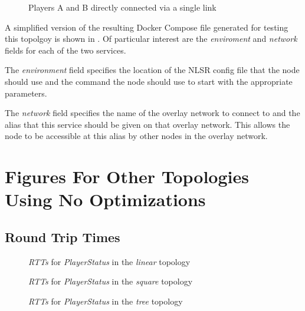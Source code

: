 \begin{appendices}
\begin{figure}[H]
    \centering
    \caption{Players A and B directly connected via a single link}
    \label{fig:app:docker-l2}
\end{figure}

A simplified version of the resulting Docker Compose file generated for testing this topolgoy is shown in . Of particular interest are the \textit{enviroment} and \textit{network} fields for each of the two services. 

The \textit{environment} field specifies the location of the NLSR config file that the node should use and the command the node should use to start \game{} with the appropriate parameters.

The \textit{network} field specifies the name of the overlay network to connect to and the alias that this service should be given on that overlay network. This allows the node to be accessible at this alias by other nodes in the overlay network.







\chapter{Figures For Other Topologies Using No Optimizations}\label{app:eval:basic}
\section{Round Trip Times}
\begin{figure}[H]
    \centering
    \caption{\textit{RTTs} for \textit{PlayerStatus} in the \textit{linear} topology}
    \label{fig:app:rtt:linear}
\end{figure}

\begin{figure}[H]
    \centering
    \caption{\textit{RTTs} for \textit{PlayerStatus} in the \textit{square} topology}
    \label{fig:app:rtt:square}
\end{figure}

\begin{figure}[H]
    \centering
    \caption{\textit{RTTs} for \textit{PlayerStatus} in the \textit{tree} topology}
    \label{fig:app:rtt:tree}
\end{figure}


\end{appendices}
